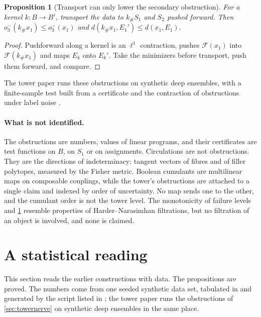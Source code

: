 \documentclass[11pt]{article}
\newtheorem{proposition}[theorem]{Proposition}
\theoremstyle{definition}
\theoremstyle{remark}
\begin{document}
\begin{proposition}[Transport can only lower the secondary obstruction]\label{prop:o3transport}
For a kernel $k\colon B\to B'$, transport the data to $k_\#S_1$ and $S_2$ pushed forward. Then $o_3^-(k_\#x_1)\le o_3^-(x_1)$ and
$d(k_\#x_1,E_1')\le d(x_1,E_1)$.
\end{proposition}
\begin{proof}
Pushforward along a kernel is an $\ell^1$ contraction, pushes $\mathcal F(x_1)$ into $\mathcal F(k_\#x_1)$ and maps $E_k$
onto $E_k'$. Take the minimizers before transport, push them forward, and compare.
\end{proof}

The tower paper runs these obstructions on synthetic deep ensembles, with a finite-sample test built from a certificate
and the contraction of obstructions under label noise \cite[Section~11]{Awasthi-Tower}.

\paragraph{What is not identified.} The obstructions are numbers, values of linear programs, and their certificates are test
functions on $B$, on $S_1$ or on assignments. Circulations are not obstructions. They are the directions of indeterminacy:
tangent vectors of fibres and of filler polytopes, measured by the Fisher metric. Boolean cumulants are multilinear maps on
composable couplings, while the tower's obstructions are attached to a single claim and indexed by order of uncertainty. No
map sends one to the other, and the cumulant order is not the tower level. The monotonicity of failure levels
\cite[Thm.~10.5]{Awasthi-Tower} and \cref{prop:o3transport} resemble properties of Harder--Narasimhan filtrations, but no
filtration of an object is involved, and none is claimed.

\section{A statistical reading}\label{sec:stats}

This section reads the earlier constructions with data. The propositions are proved. The numbers come from one
seeded synthetic data set, tabulated in \cite[\S15]{Awasthi-Family} and generated by the script listed in
\cite[Section~15]{Awasthi-Tower}; the tower paper runs the obstructions of \cref{sec:towernerve} on synthetic deep
ensembles in the same place.
\end{document}
